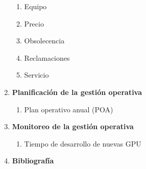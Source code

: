 \documentclass{article}
\newenvironment{indexPre}{}{}
\begin{document}
\begin{indexPre}
\begin{spacing}{1.15}
\begin{enumerate}
\begin{enumerate}
      \item Equipo
      \item Precio
      \item Obsolecencia
      \item Reclamaciones
      \item Servicio
    \end{enumerate}
    \item \textbf{Planificación de la gestión operativa}
    \begin{enumerate}
      \item Plan operativo anual (POA)
    \end{enumerate}
    \item \textbf{Monitoreo de la gestión operativa}
    \begin{enumerate}
      \item Tiempo de desarrollo de nuevas GPU
    \end{enumerate}
    \item \textbf{Bibliografía}
  \end{enumerate}
\end{spacing}


\end{indexPre}

\newpage

\vspace*{\fill}
\end{document}
